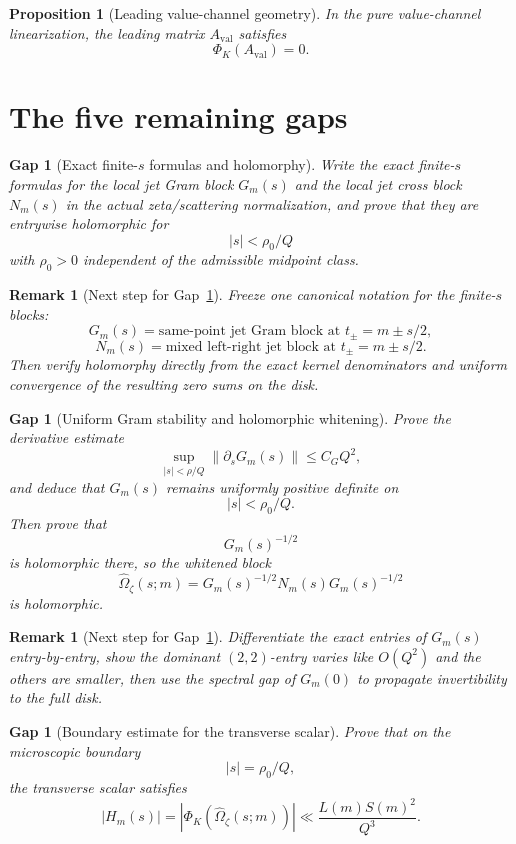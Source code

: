 \documentclass[11pt]{article}
\newtheorem{proposition}[theorem]{Proposition}
\newtheorem{remark}[theorem]{Remark}
\newtheorem{gap}[theorem]{Gap}
\newcommand{\Om}{\Omega}
\newcommand{\val}{\mathrm{val}}
\newcommand{\zetaSide}{\zeta}
\begin{document}
\begin{proposition}[Leading value-channel geometry]
In the pure value-channel linearization, the leading matrix $A_{\val}$
satisfies
\[
\Phi_K(A_{\val})=0.
\]
\end{proposition}

\section{The five remaining gaps}

\begin{gap}[Exact finite-$s$ formulas and holomorphy]
\label{gap:finite-s-formulas}
Write the exact finite-$s$ formulas for the local jet Gram block $G_m(s)$ and
the local jet cross block $N_m(s)$ in the actual zeta/scattering normalization,
and prove that they are entrywise holomorphic for
\[
|s|<\rho_0/Q
\]
with $\rho_0>0$ independent of the admissible midpoint class.
\end{gap}

\begin{remark}[Next step for Gap~\ref{gap:finite-s-formulas}]
Freeze one canonical notation for the finite-$s$ blocks:
\[
G_m(s)=\text{same-point jet Gram block at }t_\pm=m\pm s/2,
\]
\[
N_m(s)=\text{mixed left-right jet block at }t_\pm=m\pm s/2.
\]
Then verify holomorphy directly from the exact kernel denominators and uniform
convergence of the resulting zero sums on the disk.
\end{remark}

\begin{gap}[Uniform Gram stability and holomorphic whitening]
\label{gap:gram-stability}
Prove the derivative estimate
\[
\sup_{|s|<\rho/Q}\|\partial_s G_m(s)\|\le C_GQ^2,
\]
and deduce that $G_m(s)$ remains uniformly positive definite on
\[
|s|<\rho_0/Q.
\]
Then prove that
\[
G_m(s)^{-1/2}
\]
is holomorphic there, so the whitened block
\[
\widehat{\Om}_{\zetaSide}(s;m)
=
G_m(s)^{-1/2}N_m(s)G_m(s)^{-1/2}
\]
is holomorphic.
\end{gap}

\begin{remark}[Next step for Gap~\ref{gap:gram-stability}]
Differentiate the exact entries of $G_m(s)$ entry-by-entry, show the dominant
$(2,2)$-entry varies like $O(Q^2)$ and the others are smaller, then use the
spectral gap of $G_m(0)$ to propagate invertibility to the full disk.
\end{remark}

\begin{gap}[Boundary estimate for the transverse scalar]
\label{gap:boundary}
Prove that on the microscopic boundary
\[
|s|=\rho_0/Q,
\]
the transverse scalar satisfies
\[
|H_m(s)|=
|\Phi_K(\widehat{\Om}_{\zetaSide}(s;m))|
\ll
\frac{L(m)S(m)^2}{Q^3}.
\]
\end{gap}
\end{document}
